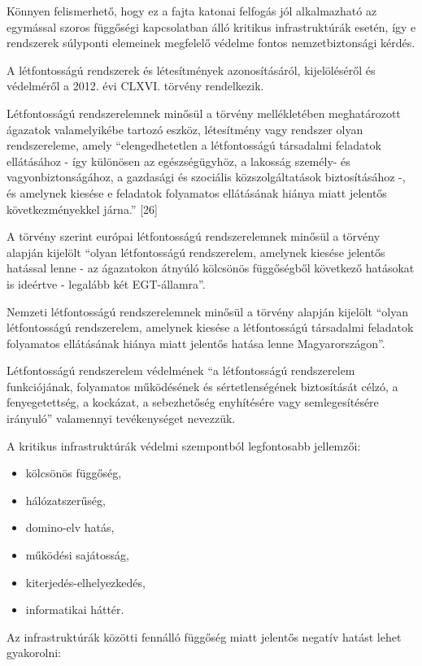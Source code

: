 \documentclass[12pt,magyar,a4paper,oneside]{scrreprt}
\providecommand{\tightlist}{%
  \setlength{\itemsep}{0pt}\setlength{\parskip}{0pt}}
\begin{document}
Könnyen felismerhető, hogy ez a fajta katonai felfogás jól alkalmazható
az egymással szoros függőségi kapcsolatban álló kritikus infrastruktúrák
esetén, így e rendszerek súlyponti elemeinek megfelelő védelme fontos
nemzetbiztonsági kérdés.

A létfontosságú rendszerek és létesítmények azonosításáról,
kijelöléséről és védelméről a 2012. évi CLXVI. törvény rendelkezik.

Létfontosságú rendszerelemnek minősül a törvény mellékletében
meghatározott ágazatok valamelyikébe tartozó eszköz, létesítmény vagy
rendszer olyan rendszereleme, amely ``elengedhetetlen a létfontosságú
társadalmi feladatok ellátásához - így különösen az egészségügyhöz, a
lakosság személy- és vagyonbiztonságához, a gazdasági és szociális
közszolgáltatások biztosításához -, és amelynek kiesése e feladatok
folyamatos ellátásának hiánya miatt jelentős következményekkel járna.''
{[}26{]}

A törvény szerint európai létfontosságú rendszerelemnek minősül a
törvény alapján kijelölt ``olyan létfontosságú rendszerelem, amelynek
kiesése jelentős hatással lenne - az ágazatokon átnyúló kölcsönös
függőségből következő hatásokat is ideértve - legalább két
EGT-államra''.

Nemzeti létfontosságú rendszerelemnek minősül a törvény alapján kijelölt
``olyan létfontosságú rendszerelem, amelynek kiesése a létfontosságú
társadalmi feladatok folyamatos ellátásának hiánya miatt jelentős hatása
lenne Magyarországon''.

Létfontosságú rendszerelem védelmének ``a létfontosságú rendszerelem
funkciójának, folyamatos működésének és sértetlenségének biztosítását
célzó, a fenyegetettség, a kockázat, a sebezhetőség enyhítésére vagy
semlegesítésére irányuló'' valamennyi tevékenységet nevezzük.

A kritikus infrastruktúrák védelmi szempontból legfontosabb jellemzői:

\begin{itemize}
\tightlist
\item
  kölcsönös függőség,
\item
  hálózatszerűség,
\item
  domino-elv hatás,
\item
  működési sajátosság,
\item
  kiterjedés-elhelyezkedés,
\item
  informatikai háttér.
\end{itemize}

Az infrastruktúrák közötti fennálló függőség miatt jelentős negatív
hatást lehet gyakorolni:
\end{document}
